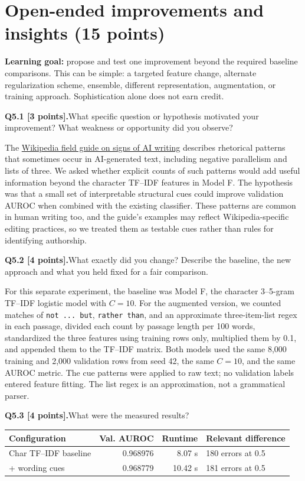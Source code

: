 \documentclass[11pt,letterpaper]{article}
\newcommand{\question}[2]{\needspace{4\baselineskip}\par\addvspace{0.45em}\noindent\textbf{#1}\quad #2\par\nobreak\vspace{0.1em}}
\begin{document}
\section{Open-ended improvements and insights (15 points)}
\textbf{Learning goal:} propose and test one improvement beyond the required baseline comparisons. This can be simple: a targeted feature change, alternate regularization scheme, ensemble, different representation, augmentation, or training approach. Sophistication alone does not earn credit.

\question{Q5.1 [3 points].}{What specific question or hypothesis motivated your improvement? What weakness or opportunity did you observe?}
The \href{https://en.wikipedia.org/wiki/Wikipedia:Signs_of_AI_writing}{Wikipedia field guide on signs of AI writing} describes rhetorical patterns that sometimes occur in AI-generated text, including negative parallelism and lists of three. We asked whether explicit counts of such patterns would add useful information beyond the character TF--IDF features in Model F. The hypothesis was that a small set of interpretable structural cues could improve validation AUROC when combined with the existing classifier. These patterns are common in human writing too, and the guide's examples may reflect Wikipedia-specific editing practices, so we treated them as testable cues rather than rules for identifying authorship.
\question{Q5.2 [4 points].}{What exactly did you change? Describe the baseline, the new approach and what you held fixed for a fair comparison.}
For this separate experiment, the baseline was Model F, the character 3--5-gram TF--IDF logistic model with $C=10$. For the augmented version, we counted matches of \texttt{not ... but}, \texttt{rather than}, and an approximate three-item-list regex in each passage, divided each count by passage length per 100 words, standardized the three features using training rows only, multiplied them by 0.1, and appended them to the TF--IDF matrix. Both models used the same 8,000 training and 2,000 validation rows from seed 42, the same $C=10$, and the same AUROC metric. The cue patterns were applied to raw text; no validation labels entered feature fitting. The list regex is an approximation, not a grammatical parser.
\question{Q5.3 [4 points].}{What were the measured results?}
\begin{tabularx}{\linewidth}{@{}YrrY@{}}\toprule Configuration & Val. AUROC & Runtime & Relevant difference \\ \midrule Char TF--IDF baseline & 0.968976 & 8.07 s & 180 errors at 0.5 \\ + wording cues & 0.968779 & 10.42 s & 181 errors at 0.5 \\ \bottomrule\end{tabularx}
\end{document}

